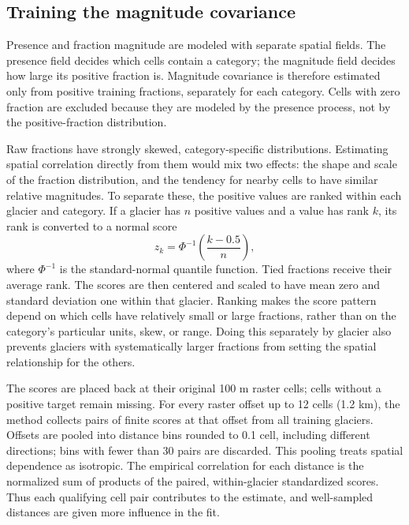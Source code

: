 \documentclass[11pt,a4paper]{article}
\begin{document}
\subsection{Training the magnitude covariance}
Presence and fraction magnitude are modeled with separate spatial fields. The
presence field decides which cells contain a category; the magnitude field
decides how large its positive fraction is. Magnitude covariance is therefore
estimated only from positive training fractions, separately for each category.
Cells with zero fraction are excluded because they are modeled by the presence
process, not by the positive-fraction distribution.

Raw fractions have strongly skewed, category-specific distributions.
Estimating spatial correlation directly from them would mix two effects: the
shape and scale of the fraction distribution, and the tendency for nearby cells
to have similar relative magnitudes. To separate these, the positive values are
ranked within each glacier and category. If a glacier has $n$ positive values
and a value has rank $k$, its rank is converted to a normal score
\[
 z_k=\Phi^{-1}\!\left(\frac{k-0.5}{n}\right),
\]
where $\Phi^{-1}$ is the standard-normal quantile function. Tied fractions
receive their average rank. The scores are then centered and scaled to have mean
zero and standard deviation one within that glacier. Ranking makes the score
pattern depend on which cells have relatively small or large fractions, rather
than on the category's particular units, skew, or range. Doing this separately
by glacier also prevents glaciers with systematically larger fractions from
setting the spatial relationship for the others.

The scores are placed back at their original 100 m raster cells; cells without
a positive target remain missing. For every raster offset up to 12 cells
(1.2 km), the method collects pairs of finite scores at that offset from all
training glaciers. Offsets are pooled into distance bins rounded to 0.1 cell,
including different directions; bins with fewer than 30 pairs are discarded.
This pooling treats spatial dependence as isotropic. The empirical correlation
for each distance is the normalized sum of products of the paired,
within-glacier standardized scores. Thus each qualifying cell pair contributes
to the estimate, and well-sampled distances are given more influence in the
fit.
\end{document}

